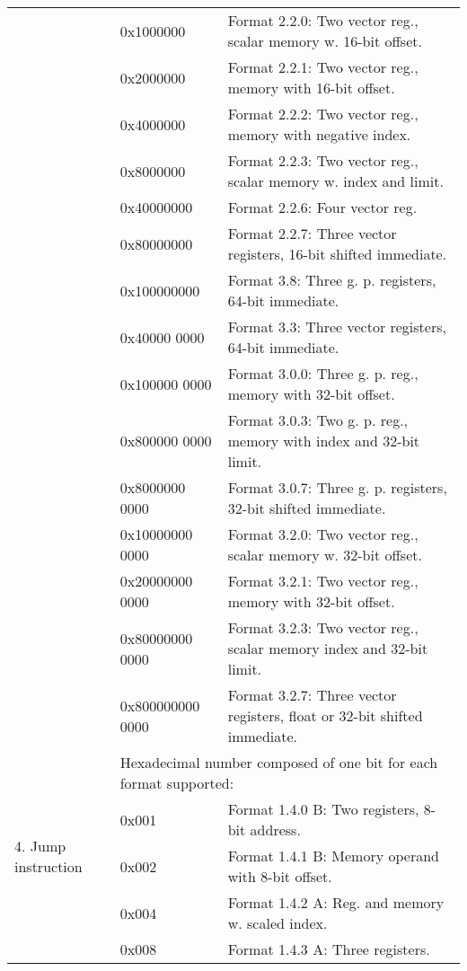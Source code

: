 \documentclass[forwardcom.tex]{subfiles}
\begin{document}
\begin{longtable} {|p{18mm}|p{20mm} p{80mm}|}
  &  0x1000000 & Format 2.2.0: Two vector reg., scalar memory w. 16-bit offset. \\
  &  0x2000000 & Format 2.2.1: Two vector reg., memory with 16-bit offset. \\
  &  0x4000000 & Format 2.2.2: Two vector reg., memory with negative index. \\
  &  0x8000000 & Format 2.2.3: Two vector reg., scalar memory w. index and limit. \\
  & 0x40000000 & Format 2.2.6: Four vector reg. \\
  & 0x80000000 & Format 2.2.7: Three vector registers, 16-bit shifted immediate.\\
  
  & 0x100000000 & Format 3.8:   Three g. p. registers, 64-bit immediate. \\
  & 0x40000 0000 & Format 3.3:   Three vector registers, 64-bit immediate. \\
 
  &  0x100000 0000 & Format 3.0.0: Three g. p. reg., memory with 32-bit offset. \\
  &  0x800000 0000 & Format 3.0.3: Two g. p. reg., memory with index and 32-bit limit.\\  
  &  0x8000000 0000 & Format 3.0.7: Three g. p. registers, 32-bit shifted immediate. \\  

  &  0x10000000 0000 & Format 3.2.0: Two vector reg., scalar memory w. 32-bit offset. \\
  &  0x20000000 0000 & Format 3.2.1: Two vector reg., memory with 32-bit offset. \\
  &  0x80000000 0000 & Format 3.2.3: Two vector reg., scalar memory index and 32-bit limit. \\
  & 0x800000000 0000 & Format 3.2.7: Three vector registers, float or 32-bit shifted immediate.\\

\hline

\multirow{12}{*}{\parbox[t]{18mm}{4. Jump instruction}} 
  &  \multicolumn{2}{|l|}{
     Hexadecimal number composed of one bit for each format supported:} \\
  &  0x001 & Format 1.4.0 B: Two registers, 8-bit address. \\
  &  0x002 & Format 1.4.1 B: Memory operand with 8-bit offset. \\
  &  0x004 & Format 1.4.2 A: Reg. and memory w. scaled index. \\
  &  0x008 & Format 1.4.3 A: Three registers. \\
  

\end{longtable}
\end{document}
